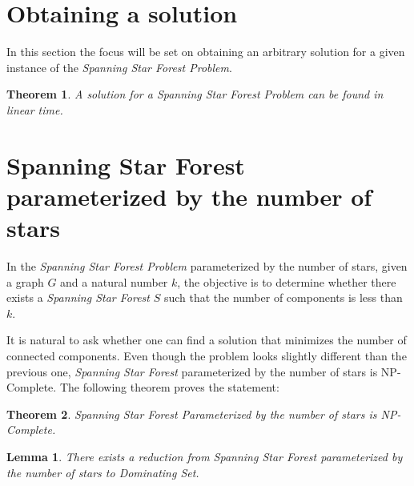 \documentclass[en]{pracamgr}
\newtheorem{theorem}{Theorem}
\newtheorem{lemma}{Lemma}
\begin{document}
\section{Obtaining a solution}

In this section the focus will be set on obtaining an arbitrary solution for
a given instance of the \emph{Spanning Star Forest Problem}.

\begin{theorem}
	A solution for a Spanning Star Forest Problem can be found in linear time.
\end{theorem}

\section{Spanning Star Forest parameterized by the number of stars}

In the \emph{Spanning Star Forest Problem} parameterized by the number of
stars, given a graph $G$ and a natural number $k$, the objective is to
determine whether there exists a \emph{Spanning Star Forest} $S$ such that
the number of components is less than $k$.

It is natural to ask whether one can find a solution that minimizes the number
of connected components. Even though the problem looks slightly different
than the previous one, \emph{Spanning Star Forest} parameterized by the 
number of stars is NP-Complete. The following theorem proves the statement:

\begin{theorem}
	Spanning Star Forest Parameterized by the number of stars is NP-Complete.
\end{theorem}

\begin{lemma}
	There exists a reduction from Spanning Star Forest parameterized by the
	number of stars to Dominating Set.
\end{lemma}
\end{document}
